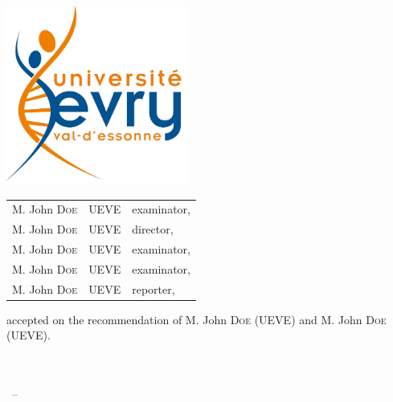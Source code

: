 \begin{titlepage}
\begin{addmargin}[-1cm]{-3cm}
\begin{center}
\includegraphics[width=6cm]{gfx/University_of_Evry_Val_d_Essonne_logo} \\ \medskip %
\vfill
\begin{center}
\begin{tabularx}{\textwidth}{XXX}
M. John \textsc{Doe} & UEVE & examinator, \\
M. John \textsc{Doe} & UEVE & director, \\
M. John \textsc{Doe} & UEVE & examinator, \\
M. John \textsc{Doe} & UEVE & examinator, \\
M. John \textsc{Doe} & UEVE & reporter, \\
\end{tabularx}
\end{center}
\medskip
accepted on the recommendation of M. John \textsc{Doe} (UEVE) and M. John \textsc{Doe} (UEVE).
\vfill
\myDepartment \\
\myFaculty \\
\myUni \\ \bigskip

\myTime\ -- \myVersion %

\vfill

\end{center}
\end{addmargin}

\renewcommand*{\thefootnote}{\arabic{footnote}}
\setcounter{footnote}{0}
\end{titlepage}
